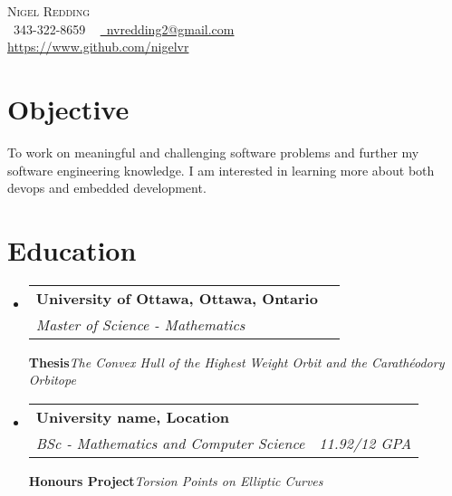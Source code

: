\documentclass[letterpaper,11pt]{article}
\makeatletter
\newcommand{\resumeSubheading}[4]{
  \vspace{-2pt}\item
    \begin{tabular*}{1.0\textwidth}[t]{l@{\extracolsep{\fill}}r}
      \textbf{#1} & \textbf{\small #2} \\
      \textit{\small#3} & \textit{\small #4} \\
    \end{tabular*}\vspace{-7pt}
}
\newcommand{\resumeSubHeadingListStart}{\begin{itemize}[leftmargin=0.0in, label={}]}
\newcommand{\resumeSubHeadingListEnd}{\end{itemize}}
\makeatother
\begin{document}
\begin{center}
    {\Huge \scshape Nigel Redding} \\ \vspace{1pt}
    \small
    \raisebox{-0.1\height}\faPhone\ 343-322-8659 ~
    \href{mailto:youremail@gmail.com}{\faEnvelope\ nvredding2@gmail.com} ~ \\
    \href{github}{https://www.github.com/nigelvr} ~
\end{center}


\section{Objective}
  \small{To work on meaningful and challenging software problems and further my software engineering knowledge. I am interested
  in learning more about both devops and embedded development.}
\vspace{-5pt}


\section{Education}
  \resumeSubHeadingListStart
    \resumeSubheading
      {University of Ottawa, Ottawa, Ontario}{}
      {Master of Science - Mathematics}{}

      \small{\textbf{Thesis}}\emph{The Convex Hull of the Highest Weight Orbit and the Carathéodory Orbitope}
      
    \resumeSubheading
      {University name, Location}{}
      {BSc - Mathematics and Computer Science}{11.92/12 GPA}

      \small{\textbf{Honours Project}}\emph{Torsion Points on Elliptic Curves}
      
  \resumeSubHeadingListEnd
\vspace{-5pt}

\end{document}

